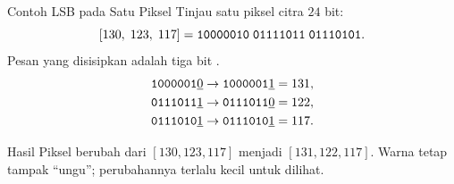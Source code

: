 \documentclass[aspectratio=169,11pt]{beamer}
\begin{document}
\begin{frame}{Contoh LSB pada Satu Piksel}
    Tinjau satu piksel citra $24$ bit:
    \[
        [130,\;123,\;117]
        = \texttt{10000010}\;\texttt{01111011}\;\texttt{01110101}.
    \]
    Pesan yang disisipkan adalah tiga bit .
    \begin{align*}
        \texttt{1000001}\underline{0} &\to \texttt{1000001}\underline{1}
            = 131, \\
        \texttt{0111011}\underline{1} &\to \texttt{0111011}\underline{0}
            = 122, \\
        \texttt{0111010}\underline{1} &\to \texttt{0111010}\underline{1}
            = 117.
    \end{align*}
    \begin{exampleblock}{Hasil}
        \footnotesize
        Piksel berubah dari $[130,123,117]$ menjadi $[131,122,117]$. Warna
        tetap tampak ``ungu''; perubahannya terlalu kecil untuk dilihat.
    \end{exampleblock}
\end{frame}
\end{document}
